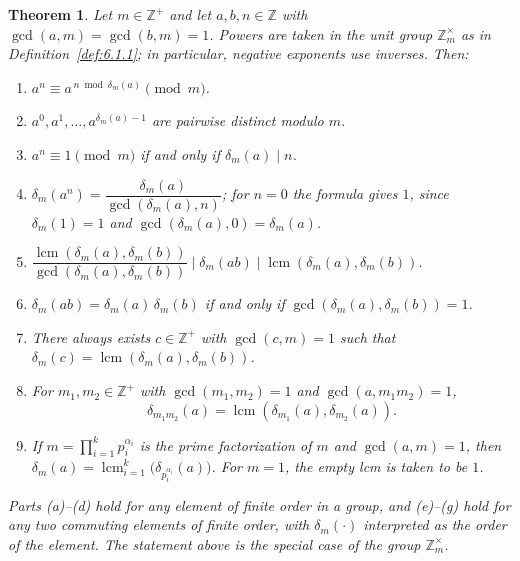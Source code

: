 \documentclass[11pt]{article}
\theoremstyle{ntstyle}
\newtheorem{theorem}{Theorem}[subsection]
\newcommand{\ZmodUnits}[1]{\mathbb{Z}_{#1}^{\times}}
\DeclareMathOperator{\lcm}{lcm}
\begin{document}
\begin{theorem}\label{thm:6.1.1} Let $m\in\mathbb{Z}^+$ and let $a,b,n\in\mathbb{Z}$ with
  $\gcd(a,m)=\gcd(b,m)=1$. Powers are taken in the unit group
  $\ZmodUnits{m}$ as in Definition~\ref{def:6.1.1}; in particular,
  negative exponents use inverses. Then:

  \begin{enumerate}[label={\alph*)}]
    \item $a^{n} \equiv a^{\,n \bmod \delta_m(a)} \pmod{m}$.
    \item $a^{0}, a^{1}, \ldots, a^{\delta_m(a) - 1}$ are pairwise
          distinct modulo $m$.
    \item $a^{n} \equiv 1 \pmod{m}$ if and only if $\delta_m(a) \mid n$.
    \item $\delta_m(a^{n}) = \dfrac{\delta_m(a)}{\gcd(\delta_m(a), n)}$; for $n=0$ the formula gives $1$, since
    $\delta_m(1)=1$ and $\gcd(\delta_m(a),0)=\delta_m(a)$.
    \item
    $\dfrac{\lcm(\delta_m(a), \delta_m(b))}{\gcd(\delta_m(a), \delta_m(b))} \mid \delta_m(ab) \mid \lcm(\delta_m(a), \delta_m(b))$.
    \item $\delta_m(ab) = \delta_m(a)\,\delta_m(b)$ if and only if
          $\gcd(\delta_m(a), \delta_m(b)) = 1$.
    \item There always exists $c \in \mathbb{Z}^+$ with $\gcd(c, m) = 1$ such that
    $\delta_m(c) = \lcm(\delta_m(a), \delta_m(b))$.
    \item For $m_1, m_2 \in \mathbb{Z}^+$ with $\gcd(m_1, m_2) = 1$
          and $\gcd(a, m_1m_2) = 1$,
          \[
            \delta_{m_1m_2}(a)
            =\lcm(\delta_{m_1}(a),\delta_{m_2}(a)).
          \]
    \item If $m = \prod_{i=1}^{k} p_i^{\alpha_i}$ is the prime factorization
          of $m$ and $\gcd(a,m)=1$, then
          $\delta_m(a)=\lcm_{i=1}^{k}\big(\delta_{p_i^{\alpha_i}}(a)\big)$.
          For $m=1$, the empty lcm is taken to be $1$.
  \end{enumerate}

  Parts (a)--(d) hold for any element of finite order in a group,
  and (e)--(g) hold for any two commuting elements of finite order, with
  $\delta_m(\cdot)$ interpreted as the order of the element. The statement above
  is the special case of the group $\ZmodUnits{m}$.

\end{theorem}
\end{document}
